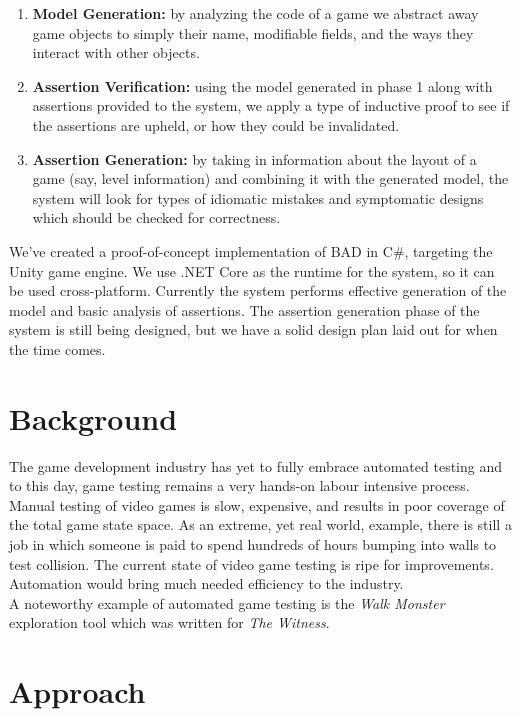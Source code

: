 \documentclass[letterpaper,twocolumn,10pt]{article}
\begin{document}
\begin{enumerate}
    \item{\textbf{Model Generation:}} by analyzing the code of a game we abstract away game objects to simply their name, modifiable fields, and the ways they interact with other objects. 
    \item {\textbf{Assertion Verification:}} using the model generated in phase 1 along with assertions provided to the system, we apply a type of inductive proof to see if the assertions are upheld, or how they could be invalidated.
    \item{\textbf{Assertion Generation:}} by taking in information about the layout of a game (say, level information) and combining it with the generated model, the system will look for types of idiomatic mistakes and symptomatic designs which should be checked for correctness.
\end{enumerate}

We've created a proof-of-concept implementation of BAD in C\#, targeting the Unity game engine. We use .NET Core as the runtime for the system, so it can be used cross-platform. Currently the system performs effective generation of the model and basic analysis of assertions. The assertion generation phase of the system is still being designed, but we have a solid design plan laid out for when the time comes. \\

\section{Background}

The game development industry has yet to fully embrace automated testing and to this day, game testing remains a very hands-on labour intensive process. Manual testing of video games is slow, expensive, and results in poor coverage of the total game state space. As an extreme, yet real world, example, there is still a job in which someone is paid to spend hundreds of hours bumping into walls to test collision. The current state of video game testing is ripe for improvements. Automation would bring much needed efficiency to the industry. \\

A noteworthy example of automated game testing is the \textit{Walk Monster}~\cite{WalkMonster} exploration tool which was written for \textit{The Witness}. 

\section{Approach}
\end{document}
